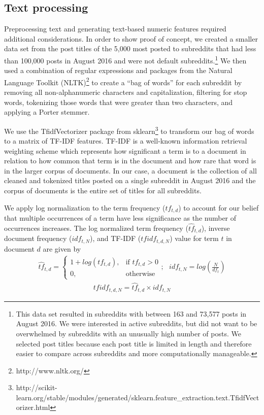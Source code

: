 \documentclass{article}
\begin{document}
\subsection{Text processing}

Preprocessing text and generating text-based numeric features required additional considerations.  In order to show proof of concept, we created a smaller data set from the post titles of the 5,000 most posted to subreddits that had less than 100,000 posts in August 2016 and were not default subreddits.\footnote{This data set resulted in subreddits with between 163 and 73,577 posts in August 2016.  We were interested in active subreddits, but did not want to be overwhelmed by subreddits with an unusually high number of posts.  We selected post titles because each post title is limited in length and therefore easier to compare across subreddits and more computationally manageable.}   We then used a combination of regular expressions and packages from the Natural Language Toolkit (NLTK)\footnote{http://www.nltk.org/} to create a “bag of words” for each subreddit by removing all non-alphanumeric characters and capitalization, filtering for stop words, tokenizing those words that were greater than two characters, and applying a Porter stemmer. 

We use the TfidfVectorizer package from sklearn\footnote{http://scikit-learn.org/stable/modules/generated/sklearn.feature\_extraction.text.TfidfVectorizer.html} to transform our bag of words to a matrix of TF-IDF features.   TF-IDF is a well-known information retrieval weighting scheme which represents how significant a term is to a document in relation to how common that term is in the document and how rare that word is in the larger corpus of documents.  In our case, a document is the collection of all cleaned and tokenized titles posted on a single subreddit in August 2016 and the corpus of documents is the entire set of titles for all subreddits.  

We apply log normalization to the term frequency ($tf_{t,d}$) to account for our belief that multiple occurrences of a term have less significance as the number of occurrences increases.  The log normalized term frequency (${\hat{tf}_{t,d}}$), inverse document frequency ($idf_{t,N}$), and TF-IDF ($tfidf_{t,d,N}$) value for term $t$ in document $d$ are given by \begin{align*}
  {\hat{tf}_{t,d}} = \begin{cases}
                  1 + log(tf_{t,d}), & \text{if $tf_{t,d}$} > 0\\
                  0, & \text{otherwise}
              \end{cases} ; \text{      }    
    idf_{t,N} = log(\frac{N}{df_t}) 
\end{align*}
\begin{align*}
tfidf_{t,d,N} = {\hat{tf}_{t,d}} \times idf_{t,N}
\end{align*}
\end{document}
